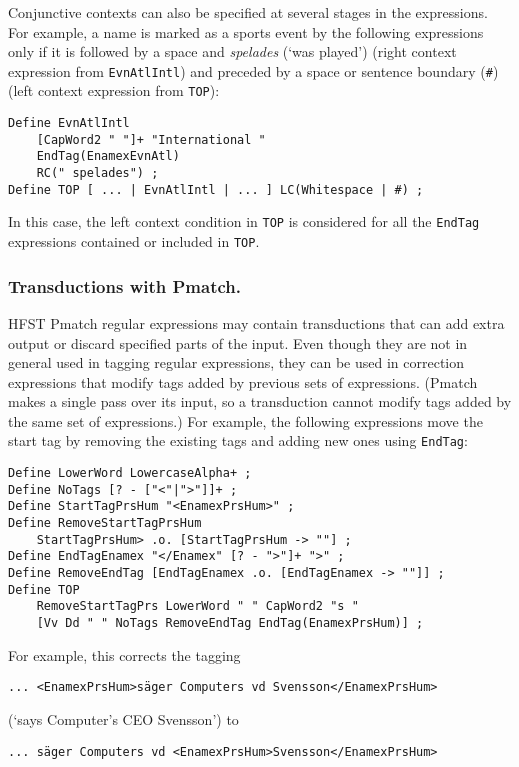 \documentclass{llncs}
\begin{document}
Conjunctive contexts can also be specified at several stages in the
expressions. For example, a name is marked as a sports event by the
following expressions only if it is followed by a space and
\textit{spelades} (`was played') (right context expression from
\texttt{EvnAtlIntl}) and preceded by a space or sentence boundary
(\texttt{\#}) (left context expression from \texttt{TOP}):

\begin{verbatim}
Define EvnAtlIntl
    [CapWord2 " "]+ "International "
    EndTag(EnamexEvnAtl)
    RC(" spelades") ;
Define TOP [ ... | EvnAtlIntl | ... ] LC(Whitespace | #) ;
\end{verbatim}

\noindent
In this case, the left context condition in \texttt{TOP} is considered
for all the \texttt{EndTag} expressions contained or included in
\texttt{TOP}.

\subsubsection{Transductions with Pmatch.}

HFST Pmatch regular expressions may contain transductions that can add
extra output or discard specified parts of the input. Even though they
are not in general used in tagging regular expressions, they can be
used in correction expressions that modify tags added by previous sets
of expressions. (Pmatch makes a single pass over its input, so a
transduction cannot modify tags added by the same set of expressions.) For
example, the following expressions move the start tag by removing the
existing tags and adding new ones using \texttt{EndTag}:

\begin{verbatim}
Define LowerWord LowercaseAlpha+ ;
Define NoTags [? - ["<"|">"]]+ ;
Define StartTagPrsHum "<EnamexPrsHum>" ;
Define RemoveStartTagPrsHum
    StartTagPrsHum> .o. [StartTagPrsHum -> ""] ;
Define EndTagEnamex "</Enamex" [? - ">"]+ ">" ;
Define RemoveEndTag [EndTagEnamex .o. [EndTagEnamex -> ""]] ;
Define TOP
    RemoveStartTagPrs LowerWord " " CapWord2 "s "
    [Vv Dd " " NoTags RemoveEndTag EndTag(EnamexPrsHum)] ;
\end{verbatim}
%
For example, this corrects the tagging
\begin{verbatim}
... <EnamexPrsHum>säger Computers vd Svensson</EnamexPrsHum>
\end{verbatim}
(`says Computer's CEO Svensson') to
\begin{verbatim}
... säger Computers vd <EnamexPrsHum>Svensson</EnamexPrsHum>
\end{verbatim}
\end{document}
